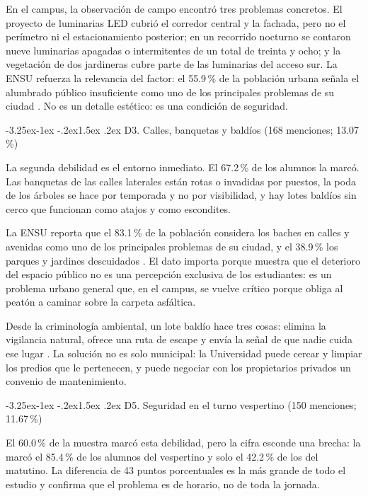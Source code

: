 \documentclass[11pt,a4paper]{article}
\makeatletter
\renewcommand\subsection{\@startsection{subsection}{2}{\z@}%
  {-3.25ex\@plus -1ex \@minus -.2ex}{1.5ex \@plus .2ex}%
  {\normalfont\large\bfseries\color{uazblue!85!black}}}
\makeatother
\begin{document}
En el campus, la observación de campo encontró tres problemas concretos. El
proyecto de luminarias LED cubrió el corredor central y la fachada, pero no el
perímetro ni el estacionamiento posterior; en un recorrido nocturno se contaron
nueve luminarias apagadas o intermitentes de un total de treinta y ocho; y la
vegetación de dos jardineras cubre parte de las luminarias del acceso sur. La
ENSU refuerza la relevancia del factor: el 55.9\,\% de la población urbana
señala el alumbrado público insuficiente como uno de los principales problemas
de su ciudad \cite{inegi2026ensu}. No es un detalle estético: es una condición
de seguridad.

\subsection{D3. Calles, banquetas y baldíos (168 menciones; 13.07\,\%)}

La segunda debilidad es el entorno inmediato. El 67.2\,\% de los alumnos la
marcó. Las banquetas de las calles laterales están rotas o invadidas por
puestos, la poda de los árboles se hace por temporada y no por visibilidad, y
hay lotes baldíos sin cerco que funcionan como atajos y como escondites.

La ENSU reporta que el 83.1\,\% de la población considera los baches en calles y
avenidas como uno de los principales problemas de su ciudad, y el 38.9\,\% los
parques y jardines descuidados \cite{inegi2026ensu}. El dato importa porque
muestra que el deterioro del espacio público no es una percepción exclusiva de
los estudiantes: es un problema urbano general que, en el campus, se vuelve
crítico porque obliga al peatón a caminar sobre la carpeta asfáltica.

Desde la criminología ambiental, un lote baldío hace tres cosas: elimina la
vigilancia natural, ofrece una ruta de escape y envía la señal de que nadie
cuida ese lugar \cite{newman1972, unodc2010}. La solución no es solo municipal:
la Universidad puede cercar y limpiar los predios que le pertenecen, y puede
negociar con los propietarios privados un convenio de mantenimiento.

\subsection{D5. Seguridad en el turno vespertino (150 menciones; 11.67\,\%)}

El 60.0\,\% de la muestra marcó esta debilidad, pero la cifra esconde una
brecha: la marcó el 85.4\,\% de los alumnos del vespertino y solo el 42.2\,\% de
los del matutino. La diferencia de 43 puntos porcentuales es la más grande de
todo el estudio y confirma que el problema es de horario, no de toda la jornada.
\end{document}
